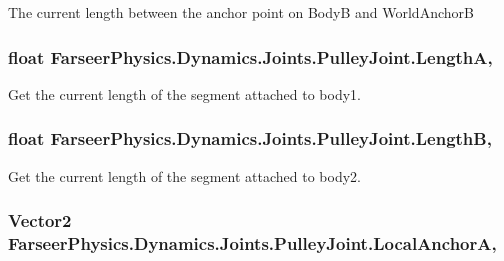 The current length between the anchor point on Body\+B and World\+Anchor\+B 

\hypertarget{class_farseer_physics_1_1_dynamics_1_1_joints_1_1_pulley_joint_a8854194aa4a8fb4fda4b4a13d9fafdea}{
\subsubsection[{Length\+A}]{\setlength{\rightskip}{0pt plus 5cm}float Farseer\+Physics.\+Dynamics.\+Joints.\+Pulley\+Joint.\+Length\+A\hspace{0.3cm}{\ttfamily [get]}, {\ttfamily [set]}}}\label{class_farseer_physics_1_1_dynamics_1_1_joints_1_1_pulley_joint_a8854194aa4a8fb4fda4b4a13d9fafdea}


Get the current length of the segment attached to body1. 

\hypertarget{class_farseer_physics_1_1_dynamics_1_1_joints_1_1_pulley_joint_a58357c7837c4a0bf66fd971902be9cd7}{
\subsubsection[{Length\+B}]{\setlength{\rightskip}{0pt plus 5cm}float Farseer\+Physics.\+Dynamics.\+Joints.\+Pulley\+Joint.\+Length\+B\hspace{0.3cm}{\ttfamily [get]}, {\ttfamily [set]}}}\label{class_farseer_physics_1_1_dynamics_1_1_joints_1_1_pulley_joint_a58357c7837c4a0bf66fd971902be9cd7}


Get the current length of the segment attached to body2. 

\hypertarget{class_farseer_physics_1_1_dynamics_1_1_joints_1_1_pulley_joint_a754646f65deae936ba468a53a1e7082d}{
\subsubsection[{Local\+Anchor\+A}]{\setlength{\rightskip}{0pt plus 5cm}Vector2 Farseer\+Physics.\+Dynamics.\+Joints.\+Pulley\+Joint.\+Local\+Anchor\+A\hspace{0.3cm}{\ttfamily [get]}, {\ttfamily [set]}}}\label{class_farseer_physics_1_1_dynamics_1_1_joints_1_1_pulley_joint_a754646f65deae936ba468a53a1e7082d}


